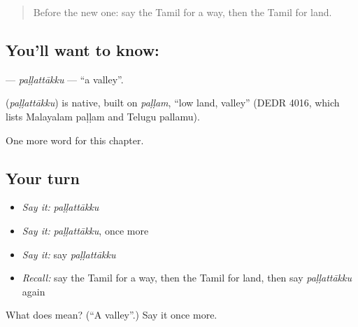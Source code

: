 \label{lesson:TA-C264-pallattakku}



\begin{quote}
Before the new one: say the Tamil for a way, then the Tamil for land.
\end{quote}

\subsection*{You'll want to know: }
\textbf{} — \emph{paḷḷattākku} — \textquotedblleft{}a valley\textquotedblright{}.

\begin{cousinweb}
\textbf{} (\emph{paḷḷattākku}) is native, built on \emph{paḷḷam}, \textquotedblleft{}low land, valley\textquotedblright{} (DEDR 4016, which lists Malayalam paḷḷam and Telugu pallamu).
\end{cousinweb}

\begin{grammarlens}[title={What you've built}]
One more word for this chapter.
\end{grammarlens}

\subsection*{Your turn}
\begin{itemize}
\raggedright
  \item \emph{Say it:} \emph{paḷḷattākku}
  \item \emph{Say it:} \emph{paḷḷattākku}, once more
  \item \emph{Say it:} say \emph{paḷḷattākku}
  \item \emph{Recall:} say the Tamil for a way, then the Tamil for land, then say \emph{paḷḷattākku} again
\end{itemize}

\begin{tcolorbox}[breakable,colback=teal!4,colframe=teal!35!black,title={Before you move on}]
What does  mean? (\textquotedblleft{}A valley\textquotedblright{}.) Say it once more.
\end{tcolorbox}
